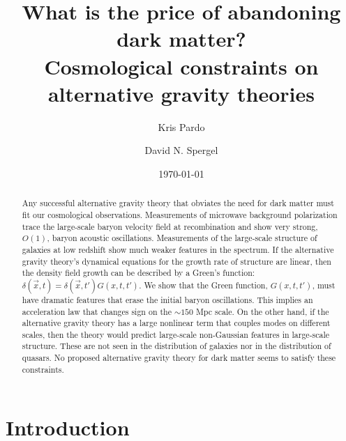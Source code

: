 \documentclass[floats,floatfix,showpacs,amssymb,amsmath,prl,twocolumn,superscriptaddress,nofootinbib, aps]{revtex4-2}
\begin{document}

\title{What is the price of abandoning dark matter?\\Cosmological constraints on alternative gravity theories}
\author{Kris Pardo}
\author{David N. Spergel}
\date{\today}
\begin{abstract}
Any successful alternative gravity theory that obviates the need for dark matter must fit our cosmological observations. Measurements of microwave background polarization trace the large-scale baryon velocity field at recombination and show very strong, $O(1)$, baryon acoustic oscillations. Measurements of the large-scale structure of galaxies at low redshift show much weaker features in the spectrum. If the alternative gravity theory's dynamical equations for the growth rate of structure are linear, then the density field growth can be described by a Green's function: $\delta(\vec x,t) = \delta(\vec x,t')G(x,t,t')$. We show that the Green function, $G(x,t,t')$, must have dramatic features that erase the initial baryon oscillations. This implies an acceleration law that changes sign on the $\sim 150$ Mpc scale. On the other hand, if the alternative gravity theory has a large nonlinear term that couples modes on different scales, then the theory would predict large-scale non-Gaussian features in large-scale structure. These are not seen in the distribution of galaxies nor in the distribution of quasars. No proposed alternative gravity theory for dark matter seems to satisfy these constraints.
\end{abstract}
\maketitle

\section{Introduction}
\end{document}

